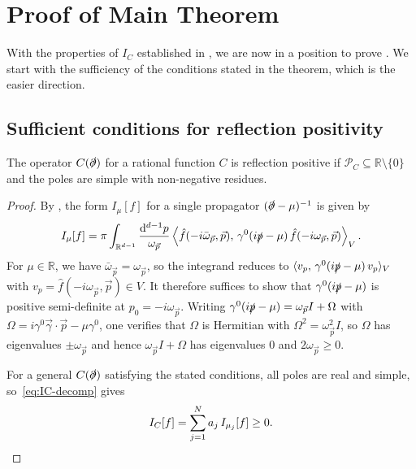 \documentclass[10pt,a4paper,oneside,reqno]{amsart}
\begin{document}
\section{Proof of Main Theorem}\label{sec:proof}
With the properties of $I_C$ established in , we are now in a position to prove . We start with the sufficiency of the conditions stated in the theorem, which is the easier direction.
\subsection{Sufficient conditions for reflection positivity}


\begin{prop}\label{sufficiency}
The operator $C(\slashed{\partial})$ for a rational function $C$ is reflection positive if $\mathcal{P}_C \subseteq \mathbb{R} \setminus \{0\}$ and the poles are simple with non-negative residues.
\end{prop}
\begin{proof}
By , the form $I_\mu[f]$ for a single propagator $(\slashed{\partial} - \mu)^{-1}$ is given by
\begin{equation}
    I_\mu[f] = \pi \int_{\mathbb{R}^{d-1}} \frac{\mathrm{d}^{d-1}p}{\omega_{\vec{p}}} \left\langle \hat{f}(-i\bar{\omega}_{\vec{p}}, \vec{p}),\, \gamma^0(i\slashed{p} - \mu)\, \hat{f}(-i\omega_{\vec{p}}, \vec{p}) \right\rangle_V.
\end{equation}
For $\mu \in \mathbb{R}$, we have $\bar{\omega}_{\vec{p}} = \omega_{\vec{p}}$, so the integrand reduces to $\langle v_p,\, \gamma^0(i\slashed{p} - \mu)\, v_p \rangle_V$ with $v_p = \hat{f}(-i\omega_{\vec{p}}, \vec{p}) \in V$. It therefore suffices to show that $\gamma^0(i\slashed{p} - \mu)$ is positive semi-definite at $p_0 = -i\omega_{\vec{p}}$. Writing $\gamma^0(i\slashed{p} - \mu) = \omega_{\vec{p}} I + \Omega$ with $\Omega = i\gamma^0 \vec{\gamma} \cdot \vec{p} - \mu\gamma^0$, one verifies that $\Omega$ is Hermitian with $\Omega^2 = \omega_{\vec{p}}^2 I$, so $\Omega$ has eigenvalues $\pm\omega_{\vec{p}}$ and hence $\omega_{\vec{p}} I + \Omega$ has eigenvalues $0$ and $2\omega_{\vec{p}} \geq 0$.

For a general $C(\slashed{\partial})$ satisfying the stated conditions, all poles are real and simple, so~\eqref{eq:IC-decomp} gives
\begin{equation}
    I_C[f] = \sum_{j=1}^{N} a_j\, I_{\mu_j}[f] \geq 0. \qedhere
\end{equation}
\end{proof}
\end{document}
